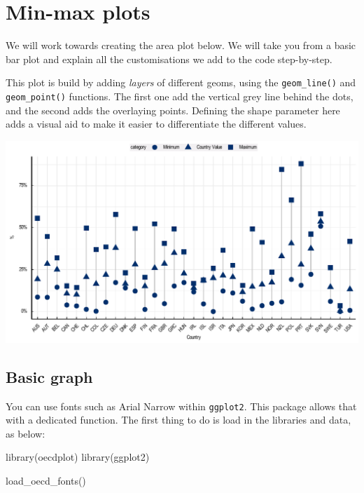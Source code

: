\documentclass[
  11pt,
  oneside]{report}
\newenvironment{Shaded}{\begin{snugshade}}{\end{snugshade}}
\newcommand{\FunctionTok}[1]{\textcolor[rgb]{0.00,0.00,0.00}{#1}}
\newcommand{\NormalTok}[1]{#1}
\begin{document}
\hypertarget{min-max-plots}{%
\chapter{Min-max plots}\label{min-max-plots}}

We will work towards creating the area plot below. We will take you from
a basic bar plot and explain all the customisations we add to the code
step-by-step.

This plot is build by adding \emph{layers} of different geoms, using the
\texttt{geom\_line()} and \texttt{geom\_point()} functions. The first
one add the vertical grey line behind the dots, and the second adds the
overlaying points. Defining the shape parameter here adds a visual aid
to make it easier to differentiate the different values.

\begin{center}\includegraphics{book_figures/maxmin_final-1} \end{center}

\hypertarget{basic-graph-2}{%
\section{Basic graph}\label{basic-graph-2}}

You can use fonts such as Arial Narrow within \texttt{ggplot2}. This
package allows that with a dedicated function. The first thing to do is
load in the libraries and data, as below:

\begin{Shaded}
\begin{Highlighting}[]
\FunctionTok{library}\NormalTok{(oecdplot)}
\FunctionTok{library}\NormalTok{(ggplot2)}

\FunctionTok{load\_oecd\_fonts}\NormalTok{()}
\end{Highlighting}
\end{Shaded}
\end{document}
